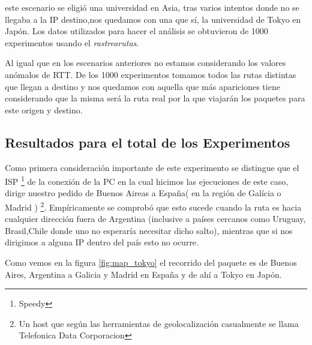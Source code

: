  este escenario se eligi\'o una universidad en Asia, tras varios intentos donde no se llegaba a la IP destino,nos quedamos con una que s\'i, la universidad de Tokyo en Jap\'on.
Los datos utilizados para hacer el an\'alisis se obtuvieron de 1000 experimentos usando el \emph{rastrearutas}. \newline

\par Al igual que en los escenarios anteriores no estamos considerando los valores an\'omalos de RTT. De los 1000 experimentos tomamos todos las rutas distintas que llegan a destino y  nos quedamos con aquella que m\'as apariciones tiene considerando que la misma ser\'a la ruta real por la que viajar\'an los paquetes para este origen y destino.

\subsection{Resultados para el total de los Experimentos}

\par Como primera consideraci\'on importante de este experimento se distingue que el ISP \footnote{Speedy} de la conexi\'on de la PC en la cual hicimos las ejecuciones de este caso, dirige nuestro pedido de Buenos Aireas a España( en la región de Gal\'icia o Madrid ) \footnote{Un host que seg\'un las herramientas de geolocalizaci\'on casualmente se llama Telefonica Data Corporacion}. Emp\'iricamente se comprob\'o que esto sucede cuando la ruta es hacia cualquier direcci\'on fuera de Argentina (inclusive a pa\'ises cercanos como Uruguay, Brasil,Chile donde uno no esperar\'ia necesitar dicho salto), mientras que si nos    dirigimos a alguna IP dentro del pa\'is esto no ocurre. \newline


\begin{figure*}[htb]
    \centering
    \texttt{[image: img/escenario3/\{tokyouniv\_3.path.978.map]}.pdf}
    \caption{Mapa de Ruta a destino}
    \label{fig:map_tokyo}
\end{figure*}

\par Como vemos en la figura \ref{fig:map_tokyo} el recorrido del paquete es de Buenos Aires, Argentina a Galicia y Madrid en España y de ah\'i a Tokyo en Jap\'on. \newline

